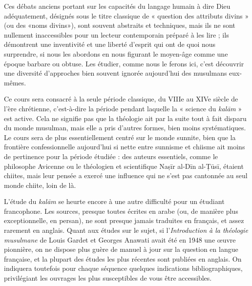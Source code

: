 Ces débats anciens portant sur les capacités du langage humain à dire
Dieu adéquatement, désignés sous le titre classique de « question des
attributs divins » (ou des
«noms divins»), sont souvent abstraits et techniques, mais ils ne sont
nullement inaccessibles pour un lecteur contemporain préparé à les lire
; ils démontrent une inventivité et une liberté d'esprit qui ont de quoi
nous surprendre, si nous les abordons en nous figurant le moyen-âge
comme une époque barbare ou obtuse. Les étudier, comme nous le ferons
ici, c'est découvrir une diversité d'approches bien souvent ignorée
aujourd'hui des musulmans eux-mêmes.

Ce cours sera consacré à la seule période classique, du VIIIe au XIVe
siècle de l'ère chrétienne, c'est-à-dire la période pendant laquelle la
« science du \emph{kalām} » est active. Cela ne signifie pas que la
théologie ait par la suite tout à fait disparu du monde musulman, mais
elle a pris d'autres formes, bien moins systématiques. Le cours sera de
plus essentiellement centré sur le monde sunnite, bien que la frontière
confessionnelle aujourd'hui si nette entre sunnisme et chiisme ait moins
de pertinence pour la période étudiée : des auteurs essentiels, comme le
philosophe Avicenne ou le théologien et scientifique Naṣīr al-Dīn
al-Ṭūsī, étaient chiites, mais leur pensée a exercé une influence qui ne
s'est pas cantonnée au seul monde chiite, loin de là.

L'étude du \emph{kalām} se heurte encore à une autre difficulté pour un
étudiant francophone. Les sources, presque toutes écrites en arabe (ou,
de manière plus exceptionnelle, en persan), ne sont presque jamais
traduites en français, et assez rarement en anglais. Quant aux études
sur le sujet, si l'\emph{Introduction à la théologie musulmane} de Louis
Gardet et Georges Anawati avait été en 1948 une œuvre pionnière, on ne
dispose plus guère de manuel à jour sur la question en langue française,
et la plupart des études les plus récentes sont publiées en anglais. On
indiquera toutefois pour chaque séquence quelques indications
bibliographiques, privilégiant les ouvrages les plus susceptibles de
vous être accessibles.


